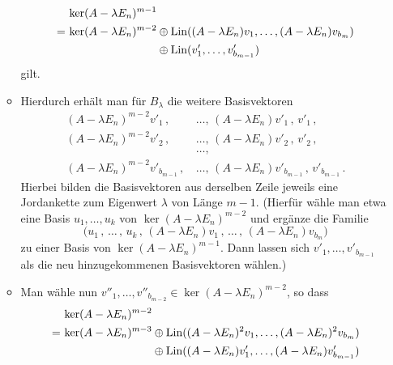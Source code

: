 \documentclass[a4paper,10pt,numbers = noenddot]{scrartcl}
\begin{document}
\begin{itemize}[resume]
\begin{itemize}
\begin{align*}
           &\,          \ker (A - \lambda E_n)^{m-1}  \\
          =&\,          \ker (A - \lambda E_n)^{m-2}
                \oplus  \Lin( (A - \lambda E_n) v_1, \dotsc, (A - \lambda E_n) v_{b_m} )  \\
           &\,          \phantom{\ker (A - \lambda E_n)^{m-2}\,}
                \oplus  \Lin( v'_1, \dotsc, v'_{b_{m-1}}  )
        \end{align*}
        gilt.
      \item
        Hierdurch erhält man für $B_\lambda$ die weitere Basisvektoren
        \begin{align*}
          (A - \lambda E_n)^{m-2} v'_1\,,\,         &\dotsc,\,  (A - \lambda E_n) v'_1\,,\,         v'_1\,,     \\
          (A - \lambda E_n)^{m-2} v'_2\,,\,         &\dotsc,\,  (A - \lambda E_n) v'_2\,,\,         v'_2\,,     \\
                                                    &\dotsc,                                                    \\
          (A - \lambda E_n)^{m-2} v'_{b_{m-1}}\,,\, &\dotsc,\,  (A - \lambda E_n) v'_{b_{m-1}}\,,\, v'_{b_{m-1}}\,.
        \end{align*}
        Hierbei bilden die Basisvektoren aus derselben Zeile jeweils eine Jordankette zum Eigenwert $\lambda$ von Länge $m-1$.
        (Hierfür wähle man etwa eine Basis $u_1, \dotsc, u_k$ von $\ker (A - \lambda E_n)^{m-2}$ und ergänze die Familie
        \[
          \bigl(
            u_1 \,,\, \dotsc \,,\, u_k \,,\,
            (A - \lambda E_n) v_1 \,,\, \dotsc \,,\, (A - \lambda E_n) v_{b_m}
          \bigr)
        \]
        zu einer Basis von $\ker (A - \lambda E_n)^{m-1}$.
        Dann lassen sich $v'_1, \dotsc, v'_{b_{m-1}}$ als die neu hinzugekommenen Basisvektoren wählen.)
      \item
        Man wähle nun $v''_1, \dotsc, v''_{b_{m-2}} \in \ker (A - \lambda E_n)^{m-2}$, so dass
        \begin{align*}
           &\,          \ker (A - \lambda E_n)^{m-2}  \\
          =&\,          \ker (A - \lambda E_n)^{m-3}
                \oplus  \Lin( (A - \lambda E_n)^2 v_1, \dotsc, (A - \lambda E_n)^2 v_{b_m} )  \\
           &\,          \phantom{\ker (A - \lambda E_n)^{m-2}\,}
                \oplus  \Lin( (A - \lambda E_n) v'_1, \dotsc, (A - \lambda E_n) v'_{b_{m-1}}  ) \\

\end{align*}
\end{itemize}
\end{itemize}
\end{document}
